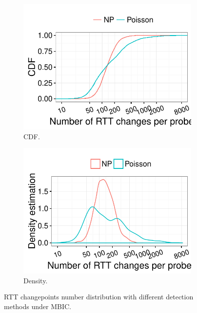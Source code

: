 \begin{figure}[!htb]
    \centering
    \begin{subfigure}[b]{.48\textwidth}
	\centering
	\includegraphics[width=\textwidth]{gfx/chap4/rtt_ch_count_cdf_cmp.pdf}
	\caption{\footnotesize CDF.}
	\label{fig:rtt_ch_count_cdf_cmp}
	\end{subfigure}
	\begin{subfigure}[b]{.48\textwidth}
	\centering
	\includegraphics[width=\textwidth]{gfx/chap4/rtt_ch_count_density_cmp.pdf}
	\caption{\footnotesize Density.}
	\label{fig:rtt_ch_count_density_cmp}
	\end{subfigure}
\caption{RTT changepoints number distribution with different detection methods under MBIC.}
\label{fig:rtt_ch_count_cmp}
\end{figure}

